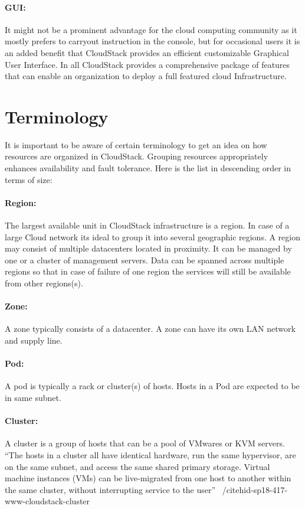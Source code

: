 \paragraph{GUI:} It might not be a prominent advantage for the cloud
computing community as it mostly prefers to carryout instruction in
the console, but for occasional users it is an added benefit that
CloudStack provides an efficient customizable Graphical User
Interface. In all CloudStack provides a comprehensive package of
features that can enable an organization to deploy a full featured
cloud Infrastructure.

\section{Terminology}

It is important to be aware of certain terminology to get an idea on
how resources are organized in CloudStack. Grouping resources 
appropriately enhances availability and fault tolerance. Here is the 
list in descending order in terms of size:
\paragraph{Region:}	The largest available unit in CloudStack infrastructure is a 
region. In case of a large Cloud network its ideal to group it into 
several geographic regions. A region may consist of multiple datacenters
located in proximity. It can be managed by one or a cluster of management
servers. Data can be spanned across multiple regions so that in case of
failure of one region the services will still be available from other regions(s).
\paragraph{Zone:}	A zone typically consists of a datacenter. A zone can have its own LAN
network and supply line. 
\paragraph{Pod:}	A pod is typically a rack or cluster(s) of hosts. Hosts in a Pod are 
expected to be in same subnet. 
\paragraph{Cluster:} 	A cluster is a group of hosts that can be a pool of VMwares or KVM 
servers. ``The hosts in a cluster all have identical hardware, run the same 
hypervisor, are on the same subnet, and access the same shared primary storage.
Virtual machine instances (VMs) can be live-migrated from one host to another
within the same cluster, without interrupting service to the user''
~/cite{hid-sp18-417-www-cloudstack-cluster}
